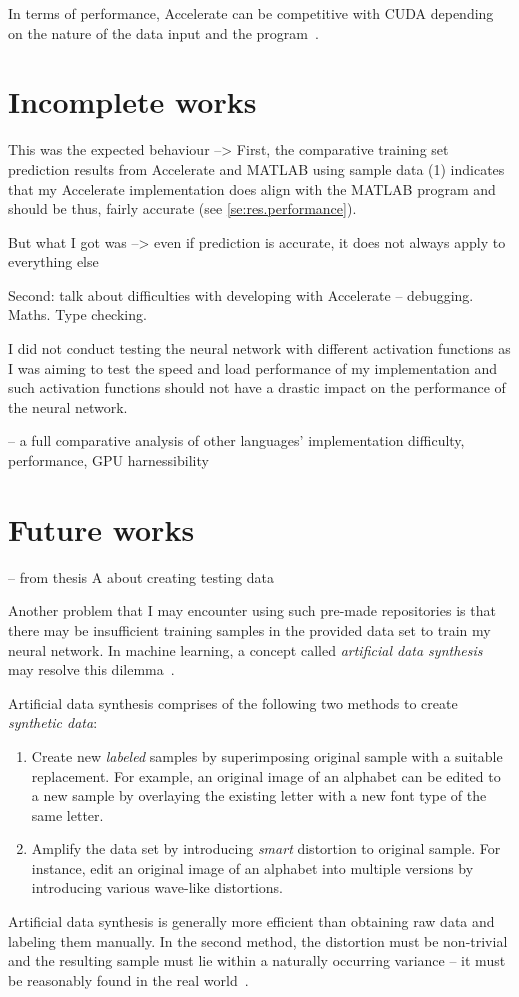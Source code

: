 In terms of performance, Accelerate can be competitive with CUDA depending on the nature of the data input and the program~\cite{McDChaKel13}. 





\section{Incomplete works} \label{se:eval.incomplete}

This was the expected behaviour --> First, the comparative training set prediction results from Accelerate and MATLAB using sample data (1) indicates that my Accelerate implementation does align with the MATLAB program and should be thus, fairly accurate (see \ref{se:res.performance}).

But what I got was --> even if prediction is accurate, it does not always apply to everything else

Second: talk about difficulties with developing with Accelerate -- debugging. Maths. Type checking.

I did not conduct testing the neural network with different activation functions as I was aiming to test the speed and load performance of my implementation and such activation functions should not have a drastic impact on the performance of the neural network.

-- a full comparative analysis of other languages' implementation difficulty, performance, GPU harnessibility

\section{Future works} \label{se:eval.future}



-- from thesis A about creating testing data

Another problem that I may encounter using such pre-made repositories is that there may be insufficient training samples in the provided data set to train my neural network. In machine learning, a concept called \textit{artificial data synthesis} may resolve this dilemma~\cite{Ng12}. 

Artificial data synthesis comprises of the following two methods to create \textit{synthetic data}: 
\begin{enumerate}
\item Create new \textit{labeled} samples by superimposing original sample with a suitable replacement. For example, an original image of an alphabet can be edited to a new sample by overlaying the existing letter with a new font type of the same letter.
\item Amplify the data set by introducing \textit{smart} distortion to original sample. For instance, edit an original image of an alphabet into multiple versions by introducing various wave-like distortions.
\end{enumerate}

Artificial data synthesis is generally more efficient than obtaining raw data and labeling them manually. In the second method, the distortion must be non-trivial and the resulting sample must lie within a naturally occurring variance -- it must be reasonably found in the real world~\cite{Ng12}.
